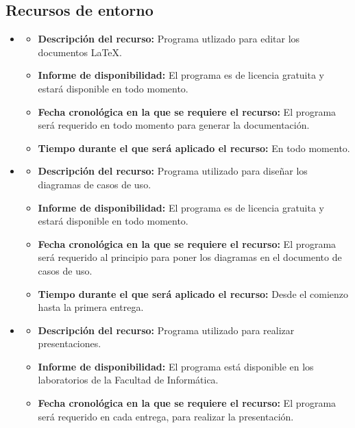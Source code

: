 \documentclass[spanish,a4paper,12pt]{report}	%
\begin{document}
		\subsection*{Recursos de entorno}
			\begin{itemize}
				  \item {}
				  	\begin{itemize}
				  	  \item \textbf{Descripción del recurso: } Programa utlizado para editar los documentos \LaTeX.
				  	  \item \textbf{Informe de disponibilidad: }El programa es de licencia gratuita y estará disponible en 
				  	  			todo momento.
				  	  \item \textbf{Fecha cronológica en la que se requiere el recurso: }El programa será requerido en todo 
				  	  				momento para generar la documentación.
				  	  \item \textbf{Tiempo durante el que será aplicado el recurso: }En todo momento. 
					\end{itemize}
				\item {}
				  	\begin{itemize}
				  	  \item \textbf{Descripción del recurso: } Programa utilizado para diseñar los diagramas de casos de uso.
				  	  \item \textbf{Informe de disponibilidad: }El programa es de licencia gratuita y estará disponible en 
				  	  			todo momento.
				  	  \item \textbf{Fecha cronológica en la que se requiere el recurso: }El programa será requerido al
				  	  			principio para poner los diagramas en el documento de casos de uso.
				  	  \item \textbf{Tiempo durante el que será aplicado el recurso: }Desde el comienzo hasta la primera entrega. 
					\end{itemize}
				\item {}
				  	\begin{itemize}
				  	  \item \textbf{Descripción del recurso: } Programa utilizado para realizar presentaciones.
				  	  \item \textbf{Informe de disponibilidad: }El programa está disponible en los laboratorios de la Facultad de Informática.
				  	  \item \textbf{Fecha cronológica en la que se requiere el recurso: }El programa será requerido en cada entrega, para realizar la presentación.

\end{itemize}
\end{itemize}
\end{document}
